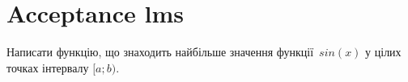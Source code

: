 \documentclass[12pt]{article}
\begin{document}
\section*{Acceptance lms}

Написати функцію, що знаходить найбільше значення функції~$sin(x)$ у цілих точках інтервалу $[a; b)$.


\end{document}
